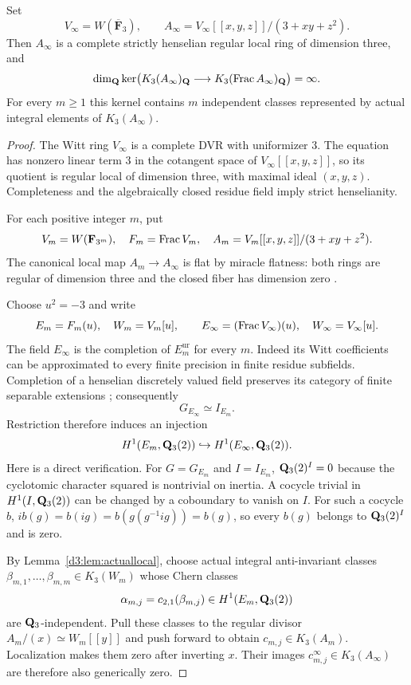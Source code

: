 \begin{theorem}
\label{d3:thm:stricthenselianinfinite}
Set
\[
 V_\infty=W(\overline{\mathbf F}_3),\qquad
 A_\infty=V_\infty[[x,y,z]]/(3+xy+z^2).
\]
Then $A_\infty$ is a complete strictly henselian regular local ring of
dimension three, and
\[
 \dim_{\mathbf Q}\ker\bigl(
   K_3(A_\infty)_{\mathbf Q}
       \longrightarrow K_3(\operatorname{Frac} A_\infty)_{\mathbf Q}\bigr)=\infty.
\]
For every $m\geq1$ this kernel contains $m$ independent classes
represented by actual integral elements of $K_3(A_\infty)$.
\end{theorem}
\begin{proof}
The Witt ring $V_\infty$ is a complete DVR with uniformizer $3$.
The equation has nonzero linear term $3$ in the cotangent space of
$V_\infty[[x,y,z]]$, so its quotient is regular local of dimension three,
with maximal ideal $(x,y,z)$. Completeness and the algebraically closed
residue field imply strict henselianity.

For each positive integer $m$, put
\[
 V_m=W(\mathbf F_{3^m}),\quad F_m=\operatorname{Frac} V_m,\quad
 A_m=V_m[[x,y,z]]/(3+xy+z^2).
\]
The canonical local map $A_m\to A_\infty$ is flat by miracle flatness:
both rings are regular of dimension three and the closed fiber has
dimension zero \cite[Tag~00R4]{StacksFlatness}.

Choose $u^2=-3$ and write
\[
 E_m=F_m(u),\quad W_m=V_m[u],\qquad
 E_\infty=(\operatorname{Frac} V_\infty)(u),\quad W_\infty=V_\infty[u].
\]
The field $E_\infty$ is the completion of $E_m^{\mathrm{ur}}$ for every
$m$. Indeed its Witt coefficients can be approximated to every finite
precision in finite residue subfields. Completion of a henselian
discretely valued field preserves its category of finite separable
extensions \cite[Lemma~4.2.1]{SaitoCompletion}; consequently
\[
 G_{E_\infty}\simeq I_{E_m}.
\]
Restriction therefore induces an injection
\begin{equation}\label{d3:eq:inertiarestriction}
 H^1(E_m,\mathbf Q_3(2))\hookrightarrow H^1(E_\infty,\mathbf Q_3(2)).
\end{equation}
Here is a direct verification. For $G=G_{E_m}$ and $I=I_{E_m}$,
$\mathbf Q_3(2)^I=0$ because the cyclotomic character squared is nontrivial
on inertia. A cocycle trivial in $H^1(I,\mathbf Q_3(2))$ can be changed by a
coboundary to vanish on $I$. For such a cocycle $b$,
$i b(g)=b(ig)=b(g(g^{-1}ig))=b(g)$, so every $b(g)$ belongs to
$\mathbf Q_3(2)^I$ and is zero.

By Lemma~\ref{d3:lem:actuallocal}, choose actual integral
anti-invariant classes
$\beta_{m,1},\ldots,\beta_{m,m}\in K_3(W_m)$ whose Chern classes
\[
 \alpha_{m,j}=c_{2,1}(\beta_{m,j})
       \in H^1(E_m,\mathbf Q_3(2))
\]
are $\mathbf Q_3$-independent. Pull these classes to the regular divisor
$A_m/(x)\simeq W_m[[y]]$ and push forward to obtain
$c_{m,j}\in K_3(A_m)$. Localization makes them zero after inverting
$x$. Their images $c^\infty_{m,j}\in K_3(A_\infty)$ are therefore
also generically zero.


\end{proof}
